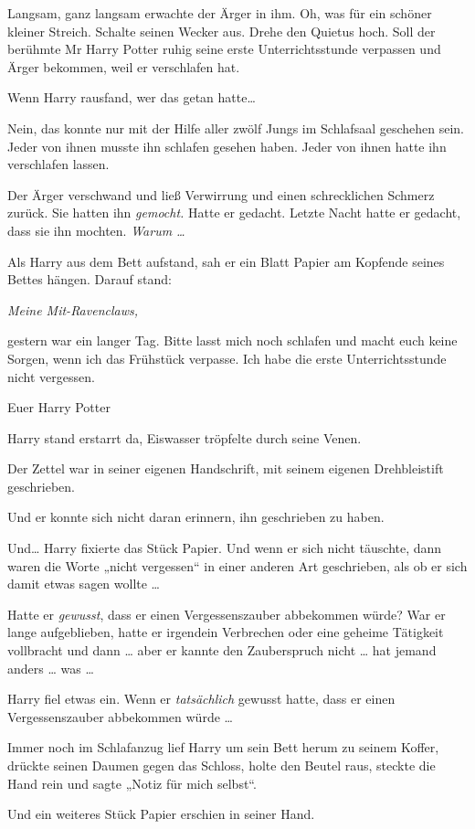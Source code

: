 {Langsam, ganz langsam erwachte der Ärger in ihm. Oh, was für ein schöner kleiner Streich. Schalte seinen Wecker aus. Drehe den Quietus hoch. Soll der berühmte Mr Harry Potter ruhig seine erste Unterrichtsstunde verpassen und Ärger bekommen, weil er verschlafen hat.

Wenn Harry rausfand, wer das getan hatte…

Nein, das konnte nur mit der Hilfe aller zwölf Jungs im Schlafsaal geschehen sein. Jeder von ihnen musste ihn schlafen gesehen haben. Jeder von ihnen hatte ihn verschlafen lassen.

Der Ärger verschwand und ließ Verwirrung und einen schrecklichen Schmerz zurück. Sie hatten ihn \emph{gemocht.} Hatte er gedacht. Letzte Nacht hatte er gedacht, dass sie ihn mochten. \emph{Warum …}

Als Harry aus dem Bett aufstand, sah er ein Blatt Papier am Kopfende seines Bettes hängen. Darauf stand:

\emph{Meine Mit-Ravenclaws,}

gestern war ein langer Tag. Bitte lasst mich noch schlafen und macht euch keine Sorgen, wenn ich das Frühstück verpasse. Ich habe die erste Unterrichtsstunde nicht vergessen.

Euer Harry Potter

Harry stand erstarrt da, Eiswasser tröpfelte durch seine Venen.

Der Zettel war in seiner eigenen Handschrift, mit seinem eigenen Drehbleistift geschrieben.

Und er konnte sich nicht daran erinnern, ihn geschrieben zu haben.

Und… Harry fixierte das Stück Papier. Und wenn er sich nicht täuschte, dann waren die Worte „nicht vergessen“ in einer anderen Art geschrieben, als ob er sich damit etwas sagen wollte …

Hatte er \emph{gewusst}, dass er einen Vergessenszauber abbekommen würde? War er lange aufgeblieben, hatte er irgendein Verbrechen oder eine geheime Tätigkeit vollbracht und dann … aber er kannte den Zauberspruch nicht … hat jemand anders … was …

Harry fiel etwas ein. Wenn er \emph{tatsächlich} gewusst hatte, dass er einen Vergessenszauber abbekommen würde …

Immer noch im Schlafanzug lief Harry um sein Bett herum zu seinem Koffer, drückte seinen Daumen gegen das Schloss, holte den Beutel raus, steckte die Hand rein und sagte „Notiz für mich selbst“.

Und ein weiteres Stück Papier erschien in seiner Hand.

}
